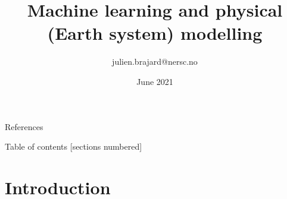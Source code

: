 \documentclass[handout]{beamer}
\title[Machine Learning]{Machine learning and physical (Earth system) modelling}
\author[J. Brajard]{julien.brajard@nersc.no}
\institute[NERSC]{NERSC\\
slides:\url{https://github.com/brajard/MAT330}\\
notebooks: https://github.com/nansencenter/ml-crashcourse}
\date{June 2021}
\begin{document}
\begin{frame}
\titlepage
\end{frame}



\begin{frame}{References}
    
    \nocite{Goodfellow-et-al-2016,VanderPlas-2016}

\end{frame}

\begin{frame}{Table of contents}
  [sections numbered]
  \tableofcontents[hideallsubsections]
\end{frame}




\section{Introduction}
\end{document}
